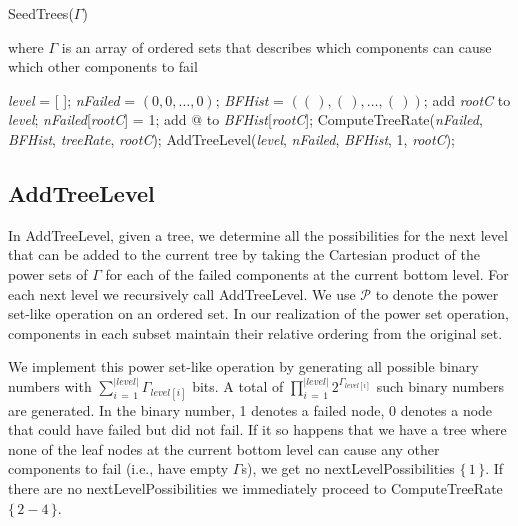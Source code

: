 \documentclass[12pt]{article}
\newcommand{\varName}[1]{\textrm{\it#1}}
\newcommand{\citeLine}[1]{$\{\,#1\,\}$}
\newcommand{\citeBlock}[2]{$\{\,#1 - #2\,\}$}
\begin{document}
\begin{algorithm}
\caption{SeedTrees($\Gamma$)}
\label{alg:Seedtrees}
where $\Gamma$ is an array of ordered sets that describes which components can cause which other components to fail \\
\begin{algorithmic}[1]
\FOR{\varName{rootC} $\in$ \varName{compSet}}
  \STATE \varName{level} = [ ]; 
  \STATE \varName{nFailed} = $(0, 0, \ldots, 0)$; 
  \STATE \varName{BFHist} = $ ((\,), (\,), \ldots, (\,)) $; 
  \STATE add \varName{rootC} to \varName{level};
  \STATE \varName{nFailed}[\varName{rootC}] = 1;
  \STATE add @ to \varName{BFHist}[\varName{rootC}]; 
  \IF{Empty($\Gamma_{\varName{rootC}}$)}
    \STATE ComputeTreeRate(\varName{nFailed}, \varName{BFHist}, \varName{treeRate}, \varName{rootC});
  \ELSE
    \STATE AddTreeLevel(\varName{level}, \varName{nFailed}, \varName{BFHist}, 1, \varName{rootC});
  \ENDIF
\ENDFOR
\end{algorithmic}
\end{algorithm}

\subsection{AddTreeLevel}

 In AddTreeLevel, given a tree, we determine all the possibilities for the next level that can be added to the current tree by taking the Cartesian product of the power sets of $\Gamma$ for each of the failed components at the current bottom level. For each next level we recursively call AddTreeLevel. We use $\mathcal{P}$ to denote the power set-like operation on an ordered set. In our realization of the power set operation, components in each subset maintain their relative ordering from the original set.

 We implement this power set-like operation by generating all possible binary numbers with $\sum\limits_{i\,=\,1}^{|level|}\Gamma_{level[i]}$ bits. A total of $\prod\limits_{i\,=\,1}^{|level|}2^{\Gamma_{level[i]}}$ such binary numbers are generated. In the binary number, 1 denotes a failed node, 0 denotes a node that could have failed but did not fail. If it so happens that we have a tree where none of the leaf nodes at the current bottom level can cause any other components to fail (i.e., have empty $\Gamma$s), we get no nextLevelPossibilities \citeLine{1}. If there are no nextLevelPossibilities we immediately proceed to ComputeTreeRate \citeBlock{2}{4}.
\end{document}
